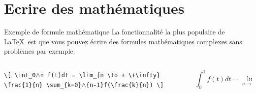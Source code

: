 \documentclass[handout]{beamer}
\begin{document}
\section{Ecrire des mathématiques}
\begin{frame}{Exemple de formule mathématique}
La fonctionnalité la plus populaire de \LaTeX \ est que vous pouvez écrire des formules mathématiques complexes sans problèmes par exemple:\\[11pt]

\begin{columns}
	\begin{column}{0.5\textwidth}
		\texttt{\textbackslash [ \textbackslash int\_0$\wedge$n f(t)dt = \textbackslash lim\_\{n \textbackslash to + \textbackslash +\textbackslash infty\} \textbackslash frac\{1\}\{n\} \textbackslash sum\_\{k=0\}$\wedge$\{n-1\}f(\textbackslash frac\{k\}\{n\})  \textbackslash]}
	\end{column}

	\begin{column}{0.5\textwidth}
		\[ \int_{0}^{1} f(t)dt = \lim_{n \to +\infty} \frac{1}{n}\sum_{k=0}^{n-1}f\bigg(\frac{k}{n}\bigg)\]
	\end{column}
\end{columns}
\end{frame}
\end{document}
